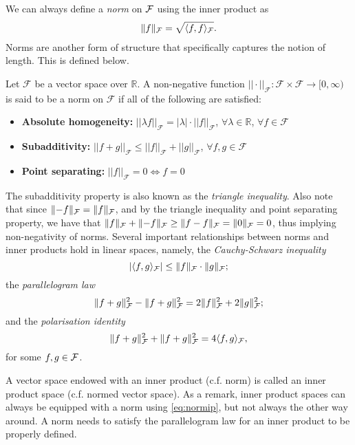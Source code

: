 We can always define a \emph{norm} on ${\mathcal F}$ using the inner product as 
\begin{align}\label{eq:normip}
  \lVert f\rVert_{\mathcal F} = \sqrt{\langle f,f\rangle_{\mathcal F}}.
\end{align}
Norms are another form of structure that specifically captures the notion of length. 
This is defined below.

\begin{definition}[Norms]
	Let $\mathcal F$ be a vector space over $\mathbb R$. A non-negative function $||\cdot||_{\mathcal F}:\mathcal F \times \mathcal F \rightarrow \mathbb [0,\infty)$ is said to be a norm  on $\mathcal F$ if all of the following are satisfied:
	\begin{itemize}
	\item \textbf{Absolute homogeneity:} $||\lambda f||_{\mathcal F} = |\lambda| \cdot ||f||_{\mathcal F}$, $\forall \lambda \in \mathbb R$, $\forall f \in \mathcal F$
	\item \textbf{Subadditivity:} $||f+g||_{\mathcal F} \leq ||f||_{\mathcal F} + ||g||_{\mathcal F}$, $\forall f,g \in \mathcal F$
	\item \textbf{Point separating:} $||f||_{\mathcal F} = 0 \Leftrightarrow f=0$
	\end{itemize}
\end{definition}

The subadditivity property is also known as the \emph{triangle inequality}.
Also note that since $\lVert-f\rVert_{\mathcal F} = \lVert f\rVert_{\mathcal F}$, and by the triangle inequality and point separating property, we have that $\lVert f\rVert_{\mathcal F} + \lVert-f\rVert_{\mathcal F} \geq \lVert f - f\rVert_{\mathcal F} = \lVert0\rVert_{\mathcal F} = 0$, thus implying non-negativity of norms.
Several important relationships between norms and inner products hold in linear spaces, namely, the \emph{Cauchy-Schwarz inequality}
\[
  |\langle f,g\rangle_{\mathcal F}| \leq \lVert f\rVert_{\mathcal F}\cdot\lVert g\rVert_{\mathcal F};
\]
the \emph{parallelogram law}
\[
  \lVert f+g\rVert_{\mathcal F}^2 - \lVert f+g\rVert_{\mathcal F}^2 = 2\lVert f\rVert_{\mathcal F}^2 + 2\lVert g\rVert_{\mathcal F}^2;
\]
and the \emph{polarisation identity}
\[
  \lVert f+g\rVert_{\mathcal F}^2 + \lVert f+g\rVert_{\mathcal F}^2 = 4\langle f,g\rangle_{\mathcal F},
\]
for some $f,g\in{\mathcal F}$.

A vector space endowed with an inner product (c.f. norm) is called an inner product space (c.f. normed vector space).
As a remark, inner product spaces can always be equipped with a norm using \eqref{eq:normip}, but not always the other way around.
A norm needs to satisfy the parallelogram law for an inner product to be properly defined.


